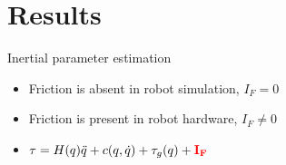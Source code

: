 
\section{Results}

\begin{frame}{Inertial parameter estimation}
	
	\vspace{0.5cm}
	
	\begin{itemize}
		\item
		Friction is absent in robot simulation, $I_{F}=0$
		\pause
		
		\item
		Friction is present in robot hardware, $I_{F}\neq0$
		\pause
		
		\item
		$\tau = H{(q)}\ddot{q} + c(q, \dot{q}) + \tau_g(q) + \textcolor{red}{\bf{I_{F}}} $
		\pause
		
	\end{itemize}
	
	\vspace{0.5cm}
	

\end{frame}
